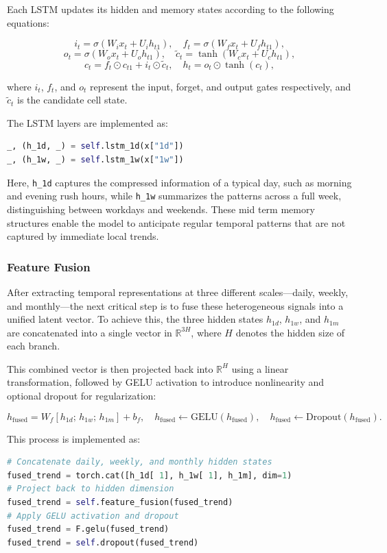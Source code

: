 \documentclass{article}
\begin{document}
Each LSTM updates its hidden and memory states according to the following equations:

\[
i_t = \sigma(W_i x_t + U_i h_{t 1}), \quad f_t = \sigma(W_f x_t + U_f h_{t 1}),
\]
\[
o_t = \sigma(W_o x_t + U_o h_{t 1}), \quad \tilde{c}_t = \tanh(W_c x_t + U_c h_{t 1}),
\]
\[
c_t = f_t \odot c_{t 1} + i_t \odot \tilde{c}_t, \quad h_t = o_t \odot \tanh(c_t),
\]

where $i_t$, $f_t$, and $o_t$ represent the input, forget, and output gates respectively, and $\tilde{c}_t$ is the candidate cell state.

The LSTM layers are implemented as:

\begin{lstlisting}[language=Python]
_, (h_1d, _) = self.lstm_1d(x["1d"])
_, (h_1w, _) = self.lstm_1w(x["1w"])
\end{lstlisting}

Here, \texttt{h\_1d} captures the compressed information of a typical day, such as morning and evening rush hours, while \texttt{h\_1w} summarizes the patterns across a full week, distinguishing between workdays and weekends. These mid term memory structures enable the model to anticipate regular temporal patterns that are not captured by immediate local trends.

\subsubsection{Feature Fusion}

After extracting temporal representations at three different scales—daily, weekly, and monthly—the next critical step is to fuse these heterogeneous signals into a unified latent vector. To achieve this, the three hidden states $h_{1d}$, $h_{1w}$, and $h_{1m}$ are concatenated into a single vector in $\mathbb{R}^{3H}$, where $H$ denotes the hidden size of each branch.

This combined vector is then projected back into $\mathbb{R}^{H}$ using a linear transformation, followed by GELU activation to introduce nonlinearity and optional dropout for regularization:

\[
h_{\text{fused}} = W_f \left[ h_{1d};\,h_{1w};\,h_{1m} \right] + b_f,
\quad
h_{\text{fused}} \leftarrow \mathrm{GELU}(h_{\text{fused}}),
\quad
h_{\text{fused}} \leftarrow \mathrm{Dropout}(h_{\text{fused}}).
\]

This process is implemented as:

\begin{lstlisting}[language=Python, caption={Feature Fusion in MS RNN}]
# Concatenate daily, weekly, and monthly hidden states
fused_trend = torch.cat([h_1d[ 1], h_1w[ 1], h_1m], dim=1)
# Project back to hidden dimension
fused_trend = self.feature_fusion(fused_trend)
# Apply GELU activation and dropout
fused_trend = F.gelu(fused_trend)
fused_trend = self.dropout(fused_trend)
\end{lstlisting}
\end{document}
